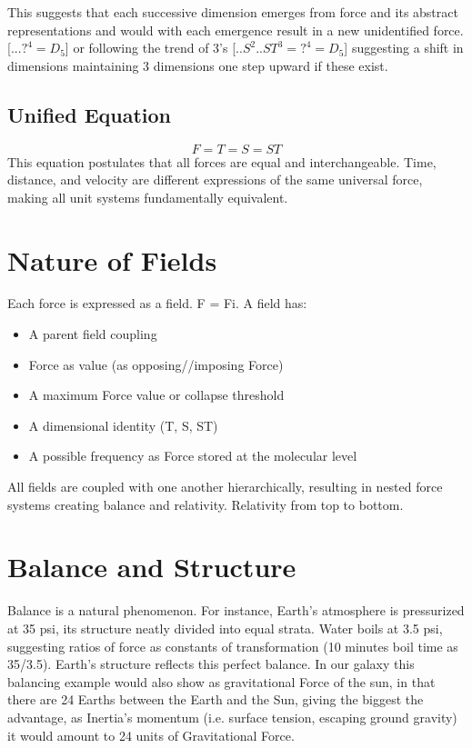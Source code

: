 \documentclass[12pt]{thesis}
\begin{document}
\noindent This suggests that each successive dimension emerges from force and its abstract representations and would with each emergence result in a new unidentified force. [$...?^4 = D_5$] or following the trend of 3's [$..S^2..ST^3 = ?^4 = D_5$] suggesting a shift in dimensions maintaining 3 dimensions one step upward if these exist.

\subsection{Unified Equation}
\[
F = T = S = ST
\]
This equation postulates that all forces are equal and interchangeable. Time, distance, and velocity are different expressions of the same universal force, making all unit systems fundamentally equivalent.

\section{Nature of Fields}
Each force is expressed as a field. F = Fi. A field has:
\begin{itemize}
    \item A parent field coupling
    \item Force as value (as opposing//imposing Force)
    \item A maximum Force value or collapse threshold
    \item A dimensional identity (T, S, ST)
    \item A possible frequency as Force stored at the molecular level
\end{itemize}

All fields are coupled with one another hierarchically, resulting in nested force systems creating balance and relativity. Relativity from top to bottom.

\section{Balance and Structure}
Balance is a natural phenomenon. For instance, Earth’s atmosphere is pressurized at 35 psi, its structure neatly divided into equal strata. Water boils at 3.5 psi, suggesting ratios of force as constants of transformation (10 minutes boil time as 35/3.5). Earth’s structure reflects this perfect balance. In our galaxy this balancing example would also show as gravitational Force of the sun, in that there are 24 Earths between the Earth and the Sun, giving the biggest the advantage, as Inertia's momentum (i.e. surface tension, escaping ground gravity) it would amount to 24 units of Gravitational Force. 
\end{document}
